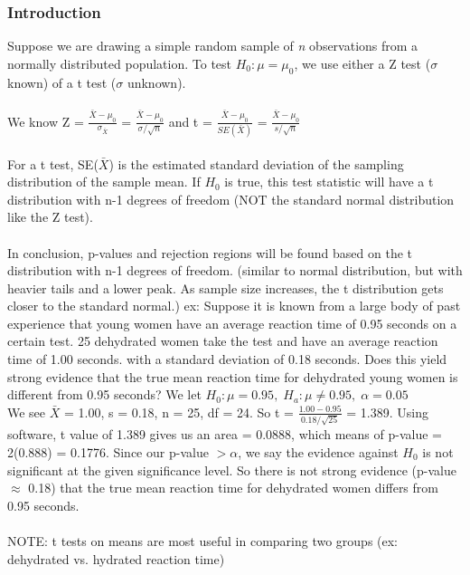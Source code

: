 \documentclass[12pt, a4paper]{article}
\begin{document}
		\subsubsection{Introduction}
		Suppose we are drawing a simple random sample of \textit{n} observations from a normally distributed population. To test $H_0: \mu = \mu_0$, we use either a Z test ($\sigma$ known) of a t test ($\sigma$ unknown). \\~\\
		We know Z = $\frac{\bar{X} - \mu_0}{\sigma_{\bar{X}}}$ = $\frac{\bar{X} - \mu_0}{\sigma/\sqrt{n}}$ and t = $\frac{\bar{X} - \mu_0}{SE(\bar{X})}$ = $\frac{\bar{X} - \mu_0}{s/\sqrt{n}}$ \\~\\
		For a t test, SE($\bar{X}$) is the estimated standard deviation of the sampling distribution of the sample mean. If $H_0$ is true, this test statistic will have a t distribution with n-1 degrees of freedom (NOT the standard normal distribution like the Z test). \\~\\
		In conclusion, p-values and rejection regions will be found based on the t distribution with n-1 degrees of freedom. (similar to normal distribution, but with heavier tails and a lower peak. As sample size increases, the t distribution gets closer to the standard normal.)\newpage
		\noindent ex: Suppose it is known from a large body of past experience that young women have an average reaction time of 0.95 seconds on a certain test. 25 dehydrated women take the test and have an average reaction time of 1.00 seconds. with a standard deviation of 0.18 seconds. Does this yield strong evidence that the true mean reaction time for dehydrated young women is different from 0.95 seconds? We let $H_0: \mu = 0.95,\; H_a: \mu \neq 0.95,\; \alpha =0.05$ \\
		We see $\bar{X}$ = 1.00, s = 0.18, n = 25, df = 24. So t = $\frac{1.00-0.95}{0.18/\sqrt{25}}$ = 1.389. Using software, t value of 1.389 gives us an area = 0.0888, which means of p-value = 2(0.888) = 0.1776. Since our p-value $> \alpha$, we say the evidence against $H_0$ is not significant at the given significance level. So there is not strong evidence (p-value $\approx$ 0.18) that the true mean reaction time for dehydrated women differs from 0.95 seconds. \\~\\
		NOTE: t tests on means are most useful in comparing two groups (ex: dehydrated vs. hydrated reaction time) \\~\\
\end{document}
